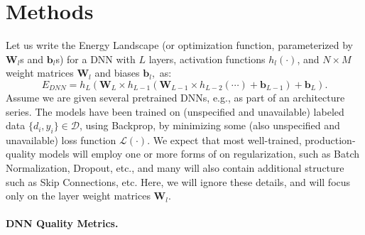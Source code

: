 \section{Methods}
\label{sxn:methods}


Let us 
write the Energy Landscape (or optimization function, parameterized by $\mathbf{W}_{l}$s and $\mathbf{b}_{l}$s) for a DNN with $L$ layers, activation functions $h_{l}(\cdot)$, and $N\times M$ weight matrices $\mathbf{W}_{l}$ and biases $\mathbf{b}_{l}$,~as:
\begin{equation}
E_{DNN}=h_{L}(\mathbf{W}_{L}\times h_{L-1}(\mathbf{W}_{L-1}\times h_{L-2}(\cdots)+\mathbf{b}_{L-1})+\mathbf{b}_{L})  .
\label{eqn:dnn_energy}
\end{equation}
Assume we are given several pretrained DNNs, e.g., as part of an architecture series.
The models have been trained on (unspecified and unavailable) labeled data $\{d_{i},y_{i}\}\in\mathcal{D}$, using Backprop, by minimizing some (also unspecified and unavailable) loss function $\mathcal{L}(\cdot)$. 
We expect that most well-trained, production-quality models will employ one or more forms of on regularization, such as Batch Normalization, Dropout, etc., and many will also contain additional structure such as Skip Connections, etc. 
Here, we will ignore these details, and will focus only on the layer weight matrices $\mathbf{W}_{l}$.


\paragraph{DNN Quality Metrics.}

